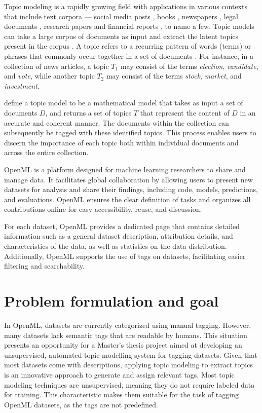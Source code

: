 Topic modeling is a rapidly growing field with applications in various contexts that include text corpora — social media posts \cite{curiskis_evaluation_2020,paul_discovering_2014,pennacchiotti_investigating_2011}, books \cite{raj_p_m_sentiment_2022}, newspapers \cite{jacobi_quantitative_2018,nicholson_search_2020,marjanen_topic_2020}, legal documents \cite{silveira_topic_nodate,oneill_analysis_2016}, research papers \cite{asmussen_smart_2019} and financial reports \cite{el_mokhtari_using_2020,garcia-mendez_automatic_2023}, to name a few. Topic models can take a large corpus of documents as input and extract the latent topics present in the corpus \cite{blei_latent_2001}. A topic refers to a recurring pattern of words (terms) or phrases that commonly occur together in a set of documents \cite{abdelrazek_topic_2022}. For instance, in a collection of news articles, a topic $T_1$ may consist of the terms \textit{election}, \textit{candidate}, and \textit{vote}, while another topic $T_2$ may consist of the terms \textit{stock}, \textit{market}, and \textit{investment}.

\citet{churchill_evolution_2022} define a topic model to be a mathematical model that takes as input a set of documents $D$, and returns a set of topics $T$ that represent the content of $D$ in an accurate and coherent manner. The documents within the collection can subsequently be tagged with these identified topics. This process enables users to discern the importance of each topic both within individual documents and across the entire collection.

OpenML \cite{vanschoren_openml_2014} is a platform designed for machine learning researchers to share and manage data. It facilitates global collaboration by allowing users to present new datasets for analysis and share their findings, including code, models, predictions, and evaluations. OpenML ensures the clear definition of tasks and organizes all contributions online for easy accessibility, reuse, and discussion.

For each dataset, OpenML provides a dedicated page that contains detailed information such as a general dataset description, attribution details, and characteristics of the data, as well as statistics on the data distribution. Additionally, OpenML supports the use of tags on datasets, facilitating easier filtering and searchability.

\section{Problem formulation and goal}
In OpenML, datasets are currently categorized using manual tagging. However, many datasets lack semantic tags that are readable by humans. This situation presents an opportunity for a Master's thesis project aimed at developing an unsupervised, automated topic modelling system for tagging datasets. Given that most datasets come with descriptions, applying topic modeling to extract topics is an innovative approach to generate and assign relevant tags. Most topic modeling techniques are unsupervised, meaning they do not require labeled data for training. This characteristic makes them suitable for the task of tagging OpenML datasets, as the tags are not predefined.

